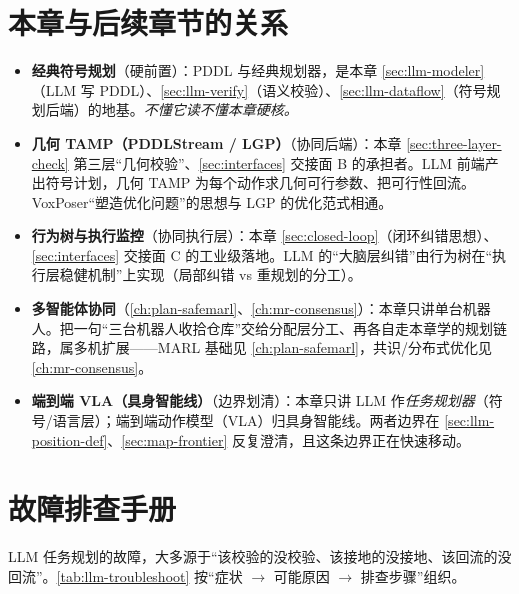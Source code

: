 \section*{本章与后续章节的关系}
\label{sec:llm-relations}

\begin{itemize}
  \item \textbf{经典符号规划}（硬前置）：PDDL 与经典规划器，是本章 \cref{sec:llm-modeler}（LLM 写 PDDL）、\cref{sec:llm-verify}（语义校验）、\cref{sec:llm-dataflow}（符号规划后端）的地基。\emph{不懂它读不懂本章硬核。}
  \item \textbf{几何 TAMP（PDDLStream / LGP）}（协同后端）：本章 \cref{sec:three-layer-check} 第三层“几何校验”、\cref{sec:interfaces} 交接面 B 的承担者。LLM 前端产出符号计划，几何 TAMP 为每个动作求几何可行参数、把可行性回流。VoxPoser“塑造优化问题”的思想与 LGP 的优化范式相通。
  \item \textbf{行为树与执行监控}（协同执行层）：本章 \cref{sec:closed-loop}（闭环纠错思想）、\cref{sec:interfaces} 交接面 C 的工业级落地。LLM 的“大脑层纠错”由行为树在“执行层稳健机制”上实现（局部纠错 vs 重规划的分工）。
  \item \textbf{多智能体协同}（\cref{ch:plan-safemarl}、\cref{ch:mr-consensus}）：本章只讲单台机器人。把一句“三台机器人收拾仓库”交给分配层分工、再各自走本章学的规划链路，属多机扩展——MARL 基础见 \cref{ch:plan-safemarl}，共识/分布式优化见 \cref{ch:mr-consensus}。
  \item \textbf{端到端 VLA（具身智能线）}（边界划清）：本章只讲 LLM 作\emph{任务规划器}（符号/语言层）；端到端动作模型（VLA）归具身智能线。两者边界在 \cref{sec:llm-position-def}、\cref{sec:map-frontier} 反复澄清，且这条边界正在快速移动。
\end{itemize}

\section*{故障排查手册}
\label{sec:llm-troubleshoot}

LLM 任务规划的故障，大多源于“该校验的没校验、该接地的没接地、该回流的没回流”。\cref{tab:llm-troubleshoot} 按“症状 $\to$ 可能原因 $\to$ 排查步骤”组织。


